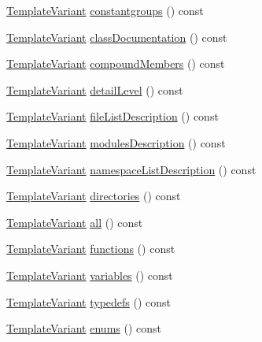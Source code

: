 \begin{DoxyCompactItemize}
\hyperlink{class_template_variant}{Template\+Variant} \hyperlink{class_translate_context_1_1_private_a12bcb80758db6209616607a5800170e8}{constantgroups} () const 
\item 
\hyperlink{class_template_variant}{Template\+Variant} \hyperlink{class_translate_context_1_1_private_afd56463b0441dfe0fc5d81104338d41b}{class\+Documentation} () const 
\item 
\hyperlink{class_template_variant}{Template\+Variant} \hyperlink{class_translate_context_1_1_private_af2f215aac3aba6193631dc0e7284e1db}{compound\+Members} () const 
\item 
\hyperlink{class_template_variant}{Template\+Variant} \hyperlink{class_translate_context_1_1_private_aa887f78ce0322fbca72f1e2024cea426}{detail\+Level} () const 
\item 
\hyperlink{class_template_variant}{Template\+Variant} \hyperlink{class_translate_context_1_1_private_acbe53e7975f5b0420cbdc399cf9eebd1}{file\+List\+Description} () const 
\item 
\hyperlink{class_template_variant}{Template\+Variant} \hyperlink{class_translate_context_1_1_private_a2698090858dd1532b65a88ee48d50efa}{modules\+Description} () const 
\item 
\hyperlink{class_template_variant}{Template\+Variant} \hyperlink{class_translate_context_1_1_private_ab8bca86f4bfd4130c5cf781a71f65829}{namespace\+List\+Description} () const 
\item 
\hyperlink{class_template_variant}{Template\+Variant} \hyperlink{class_translate_context_1_1_private_afb2ee31f4519428d30ccffaf4392eba0}{directories} () const 
\item 
\hyperlink{class_template_variant}{Template\+Variant} \hyperlink{class_translate_context_1_1_private_a39db07e3f9cc6edef30371735159e2ef}{all} () const 
\item 
\hyperlink{class_template_variant}{Template\+Variant} \hyperlink{class_translate_context_1_1_private_ab6b2a1811018488f4bee2e45dc66548e}{functions} () const 
\item 
\hyperlink{class_template_variant}{Template\+Variant} \hyperlink{class_translate_context_1_1_private_a3a93d7a81b7102230242a632090cd662}{variables} () const 
\item 
\hyperlink{class_template_variant}{Template\+Variant} \hyperlink{class_translate_context_1_1_private_aabb957434ab999a121f80c4e94d2e1fc}{typedefs} () const 
\item 
\hyperlink{class_template_variant}{Template\+Variant} \hyperlink{class_translate_context_1_1_private_a7d9e5546e4f02e092571d39896aac364}{enums} () const 

\end{DoxyCompactItemize}
